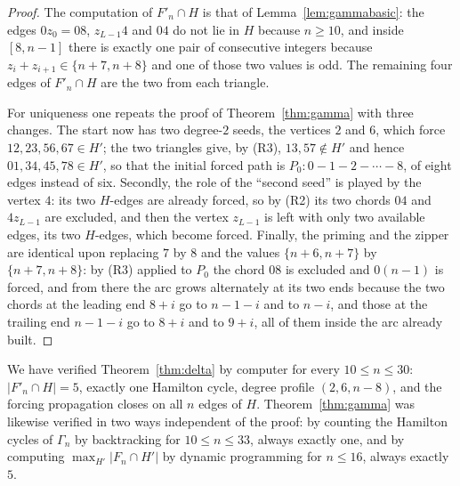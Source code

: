 \documentclass[11pt,a4paper]{article}
\theoremstyle{definition}
\theoremstyle{remark}
\begin{document}
\begin{proof}
The computation of $F'_n\cap H$ is that of Lemma~\ref{lem:gammabasic}: the edges $0z_0=08$, $z_{L-1}4$ and $04$ do not lie in $H$ because $n\ge10$, and inside $[8,n-1]$ there is exactly one pair of consecutive integers because $z_i+z_{i+1}\in\{n+7,n+8\}$ and one of those two values is odd. The remaining four edges of $F'_n\cap H$ are the two from each triangle.

For uniqueness one repeats the proof of Theorem~\ref{thm:gamma} with three changes. The start now has two degree-$2$ seeds, the vertices $2$ and $6$, which force $12,23,56,67\in H'$; the two triangles give, by (R3), $13,57\notin H'$ and hence $01,34,45,78\in H'$, so that the initial forced path is $P_0:0-1-2-\cdots-8$, of eight edges instead of six. Secondly, the role of the ``second seed'' is played by the vertex $4$: its two $H$-edges are already forced, so by (R2) its two chords $04$ and $4z_{L-1}$ are excluded, and then the vertex $z_{L-1}$ is left with only two available edges, its two $H$-edges, which become forced. Finally, the priming and the zipper are identical upon replacing $7$ by $8$ and the values $\{n+6,n+7\}$ by $\{n+7,n+8\}$: by (R3) applied to $P_0$ the chord $08$ is excluded and $0(n{-}1)$ is forced, and from there the arc grows alternately at its two ends because the two chords at the leading end $8+i$ go to $n-1-i$ and to $n-i$, and those at the trailing end $n-1-i$ go to $8+i$ and to $9+i$, all of them inside the arc already built.
\end{proof}

We have verified Theorem~\ref{thm:delta} by computer for every $10\le n\le30$: $|F'_n\cap H|=5$, exactly one Hamilton cycle, degree profile $(2,6,n-8)$, and the forcing propagation closes on all $n$ edges of $H$. Theorem~\ref{thm:gamma} was likewise verified in two ways independent of the proof: by counting the Hamilton cycles of $\Gamma_n$ by backtracking for $10\le n\le33$, always exactly one, and by computing $\max_{H'}|F_n\cap H'|$ by dynamic programming for $n\le16$, always exactly $5$.
\end{document}
